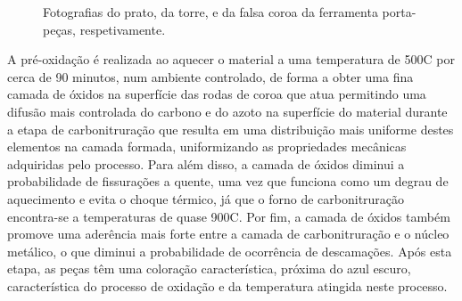 \begin{figure}[htb]
\begin{subfigure}{.33\textwidth}
        \caption{}
        \label{fig:Falsa_coroa}
    \end{subfigure}
    \caption[Fotografias dos tres componentes da ferramenta porta-peças]%
    {Fotografias do prato, da torre, e da falsa coroa da ferramenta porta-peças, respetivamente.}
\end{figure}

\par
A pré-oxidação é realizada ao aquecer o material a uma temperatura de 500\textdegree C por cerca de 90 minutos, num ambiente controlado, de forma a obter uma fina camada de óxidos na superfície das rodas de coroa que atua permitindo uma difusão mais controlada do carbono e do azoto na superfície do material durante a etapa de carbonitruração que resulta em uma distribuição mais uniforme destes elementos na camada formada, uniformizando as propriedades mecânicas adquiridas pelo processo. Para além disso, a camada de óxidos diminui a probabilidade de fissurações a quente, uma vez que funciona como um degrau de aquecimento e evita o choque térmico, já que o forno de carbonitruração encontra-se a temperaturas de quase 900\textdegree C. Por fim, a camada de óxidos também promove uma aderência mais forte entre a camada de carbonitruração e o núcleo metálico, o que diminui a probabilidade de ocorrência de descamações. Após esta etapa, as peças têm uma coloração característica, próxima do azul escuro, característica do processo de oxidação e da temperatura atingida neste processo.

